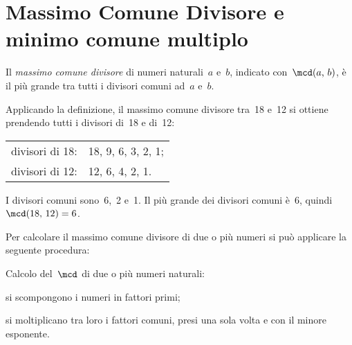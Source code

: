 \section{Massimo Comune Divisore e minimo comune multiplo}

\label{def:mcd}
\begin{definizione}
Il \emph{massimo comune divisore} di numeri naturali~$a$ e~$b$, indicato con~$\mcd(a\text{,~}b)$, è il
più grande tra tutti i divisori comuni ad~$a$ e~$b$.
\end{definizione}

Applicando la definizione, il massimo comune divisore tra~18 e~12 si ottiene prendendo tutti i divisori
di~18 e di~12:
\begin{center}
\begin{tabular}{rl}
divisori di 18: &18, 9, 6, 3, 2, 1;\\
divisori di 12: &12, 6, 4, 2, 1.\\
\end{tabular}
\end{center}
I divisori comuni sono~6,~2 e~1. Il più grande dei divisori comuni è~6, quindi $\mcd(18\text{,~}12)=6$.


Per calcolare il massimo comune divisore di due o più numeri si può applicare la seguente procedura:
\begin{procedura}
Calcolo del~$\mcd$ di due o più numeri naturali:
\begin{enumeratea}
 \item si scompongono i numeri in fattori primi;
 \item si moltiplicano tra loro i fattori comuni, presi una sola volta e con il minore esponente.
\end{enumeratea}
\end{procedura}


